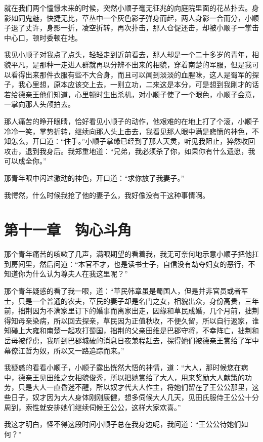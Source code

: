 就在我们两个憧憬未来的时候，突然小顺子毫无征兆的向庭院里面的花丛扑去。身影如同鬼魅，快捷无比，草丛中一个灰色影子弹身而起，两人身影一合而分，小顺子退了丈许，身影一折，凌空折转，再次扑击，那人仓促还击，却被小顺子一掌击中心口，顿时委顿在地。

我见小顺子对我点了点头，轻轻走到近前看去，那人却是一个二十多岁的青年，相貌平凡，是那种一走进人群就再以分辨不出来的相貌，穿着南楚的军服，但是我可以看得出来那件衣服有些不大合身，而且可以闻到淡淡的血腥味，这人是蜀军的探子，我心里想，原本应该交上去，一则立功，二来这是本分，可是想到我刚才的话若给德亲王他们知道，心里顿时生出杀机，对小顺子使了一个眼色，小顺子会意，一掌向那人头颅拍去。

那人痛苦的睁开眼睛，恰好看见小顺子的动作，他艰难的在地上打了个滚，小顺子冷冷一笑，掌势折转，继续向那人头上击去，我看见那人眼中满是悲愤的神色，不知怎么，开口道：“住手。”小顺子掌缘已经到了那人天灵，听见我阻止，猝然收回攻击，退到我身后。我郑重地道：“兄弟，我必须杀了你，如果你有什么遗愿，我可以成全你。”

那青年眼中闪过激动的神色，开口道：“求你放了我妻子。”

我愕然，什么时候我抢了他的妻子么，我好像没有干这种事情啊。

\chapter{第十一章　钩心斗角}

那个青年痛苦的咳嗽了几声，满眼期望的看着我，我无可奈何地示意小顺子把他扛到房间里，然后问道：“本官不才，也是读书士子，自信没有劫夺妇女的恶行，不知道你为什么认为尊夫人在我这里呢？”

那个青年疑惑的看了我一眼，道：“草民韩章虽是蜀国人，但是并非官员或者军士，只是一个普通的农夫，草民的妻子却是名门之女，相貌出众，身份高贵，三年前，拙荆因为不满家里订下的婚事而离家出走，因缘和草民成婚，几个月前，拙荆得知母亲染病，所以回去探亲，草民因为正值秋收，不便久留，所以自行返家，谁知碰上大雍和南楚一起攻打蜀国，拙荆的父亲田维是巴郡守将，不幸阵亡，拙荆和岳母被俘虏，我听到巴郡城破的消息日夜兼程赶去，探得她们被德亲王赏给了军中幕僚江哲为奴，所以又一路追踪而来。”

我疑惑的看看小顺子，小顺子露出恍然大悟的神情，道：“大人，那时候您在病中，德亲王见田维之女相貌俊秀，所以把她赏给了大人，用来奖励大人献策的功劳，只是大人一直昏迷不醒，所以奴才代大人作主，将她们留在了王公公那里，这些日子，奴才因为大人身体刚刚康健，想多伺候大人几天，见田氏服侍王公公十分周到，索性就安排她们继续伺候王公公，这样大家欢喜。”

我这才明白，怪不得这段时间小顺子总在我身边呢，我问道：“王公公待她们如何？”

